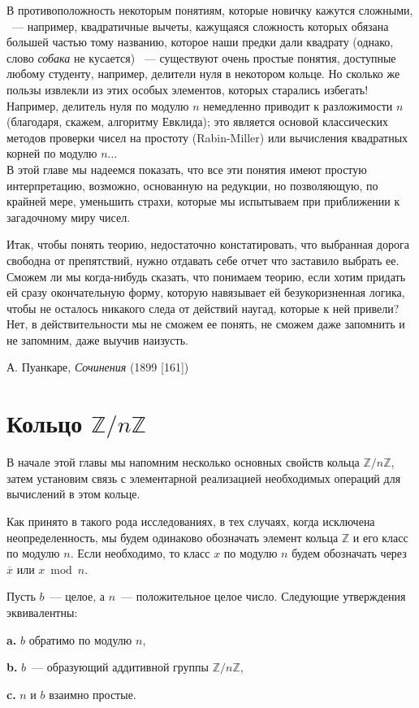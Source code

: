 \documentclass{../../template/mai_book}
\begin{document}
    \indent В противоположность некоторым понятиям, которые новичку кажутся сложными, ~— например, квадратичные вычеты, кажущаяся сложность которых обязана большей частью тому названию, которое наши предки дали квадрату (однако, слово \textit{собака} не кусается) ~— существуют очень простые понятия, доступные любому студенту, например, делители нуля в некотором кольце. Но сколько же пользы извлекли из этих особых элементов, которых старались избегать! Например, делитель нуля по модулю $n$ немедленно приводит к разложимости $n$ (благодаря, скажем, алгоритму Евклида); это является основой классических методов проверки чисел на простоту (Rabin-Miller) или вычисления квадратных корней по модулю $n\ldots$\\
    \indent В этой главе мы надеемся показать, что все эти понятия имеют простую интерпретацию, возможно, основанную на редукции, но
    позволяющую, по крайней мере, уменьшить страхи, которые мы испытываем при приближении к загадочному миру чисел.

    \epigraph {Итак, чтобы понять теорию, недостаточно констатировать, что выбранная дорога свободна от препятствий, нужно отдавать себе отчет что заставило выбрать ее. Сможем ли мы когда-нибудь сказать, что понимаем теорию, если хотим придать ей сразу окончательную форму, которую навязывает ей безукоризненная логика, чтобы не осталось никакого следа от действий наугад, которые к ней привели? Нет, в действительности мы не сможем ее понять, не сможем даже запомнить и не запомним, даже выучив наизусть.}{А. Пуанкаре, \textit{Сочинения} (1899 [161]) }

    \section{Кольцо $\mathbb{Z}/n\mathbb{Z}$}

    \noindent В начале этой главы мы напомним несколько основных свойств кольца $\mathbb{Z}/n\mathbb{Z}$, затем установим связь с элементарной реализацией необходимых операций для вычислений в этом кольце.

    Как принято в такого рода исследованиях, в тех случаях, когда исключена неопределенность, мы будем одинаково обозначать элемент
    кольца $\mathbb{Z}$ и его класс по модулю $n$. Если необходимо, то класс $x$ по модулю $n$ будем обозначать через $\overline{x}$ или $x \bmod n$.

    \begin{predl}
    \hspace*{0.5cm}
    Пусть $b$~— целое, а $n$~— положительное целое число. Следующие утверждения эквивалентны:

    {\bfseries a.\;} $b$ обратимо по модулю $n$,

    {\bfseries b.\;} $b$~— образующий аддитивной группы $\mathbb{Z}/n\mathbb{Z}$,

    {\bfseries c.\;} $n$ и $b$ взаимно простые.

    \end{predl}
\end{document}
